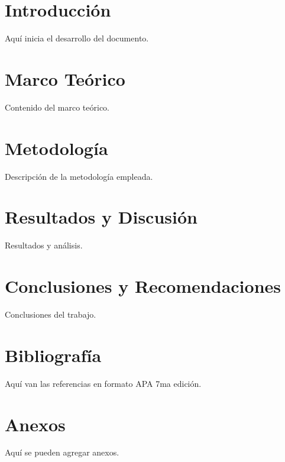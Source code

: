 \documentclass[12pt,letterpaper]{report}
\begin{document}
	
	\caratulaContenido
	
	\tableofcontents
	\newpage
	\listoffigures
	
	\newpage
	\listoftables
	\newpage
	
	
	\chapter{Introducción}
	Aquí inicia el desarrollo del documento.
	
	\chapter{Marco Teórico}
	Contenido del marco teórico.
	
	\chapter{Metodología}
	Descripción de la metodología empleada.
	
	\chapter{Resultados y Discusión}
	Resultados y análisis.
	
	\chapter{Conclusiones y Recomendaciones}
	Conclusiones del trabajo.
	
	\chapter*{Bibliografía}
	Aquí van las referencias en formato APA 7ma edición.
	
	\chapter*{Anexos}
	Aquí se pueden agregar anexos.
	
\end{document}
